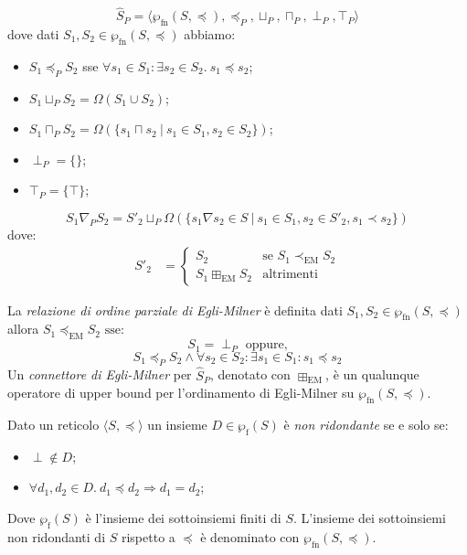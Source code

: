 \[\hat{S}_P = \langle \wp_{\textrm{fn}}(S, \preceq),\preceq_P, \sqcup_P, \sqcap_P, \perp_P, \top_P \rangle\]
dove dati \(S_1, S_2\in\wp_{\textrm{fn}}(S, \preceq)\) abbiamo:
\begin{itemize}
	\item \(S_1 \preceq_P S_2\) sse \(\forall s_1 \in S_1 : \exists s_2 \in S_2.\ s_1\preceq s_2\);
	\item \(S_1 \sqcup_P S_2 = \Omega(S_1 \cup S_2)\);
	\item \(S_1 \sqcap_P S_2 = \Omega(\{s_1 \sqcap s_2\ |\ s_1\in S_1, s_2\in S_2\})\);
	\item \(\perp_P=\{\}\);
	\item \(\top_P=\{\top\}\);
\end{itemize}


\[S_1 \nabla_P S_2 = S'_2\sqcup_P\Omega(\{ s_1\nabla s_2 \in S\ \vert\ s_1\in S_1, s_2\in S'_2, s_1\prec s_2 \})\]
dove:
	\begin{align*}
	S'_2 &=  \begin{cases}
				S_2 &\textrm{se } S_1\prec_{\textrm{EM}} S_2 \\
				S_1\boxplus_{\textrm{EM}} S_2 &\textrm{altrimenti}
				\end{cases}
	\end{align*}

\noindent La \textit{relazione di ordine parziale di Egli-Milner} è definita dati \(S_1, S_2\in\wp_{\textrm{fn}}(S, \preceq)\) allora \(S_1 \preceq_{\textrm{EM}} S_2 \textrm{ sse:} \)
\[S_1=\perp_P\textrm{ oppure,}\]
\[S_1\preceq_P S_2 \wedge \forall s_2\in S_2 : \exists s_1\in S_1: s_1\preceq s_2\]
\noindent Un \textit{connettore di Egli-Milner} per \(\hat{S}_P\), denotato con \(\boxplus_{\textrm{EM}}\), è un qualunque operatore di upper bound per l'ordinamento di Egli-Milner su \(\wp_{\textrm{fn}}(S, \preceq)\).
\fi

\begin{definition}
Dato un reticolo \(\langle S, \preceq \rangle \) un insieme \(D\in\wp_{\textrm{f}} (S)\) è \textit{non ridondante} se e solo se:
\begin{itemize}
	\item \(\perp\notin D\);
	\item \(\forall d_1, d_2 \in D.\ d_1\preceq d_2\Rightarrow d_1=d_2\);
\end{itemize}
Dove \(\wp_{\textrm{f}}(S)\) è l'insieme dei sottoinsiemi finiti di \(S\). L'insieme dei sottoinsiemi non ridondanti di \(S\) rispetto a \(\preceq\) è denominato con \(\wp_{\textrm{fn}}(S, \preceq)\).
\end{definition}

